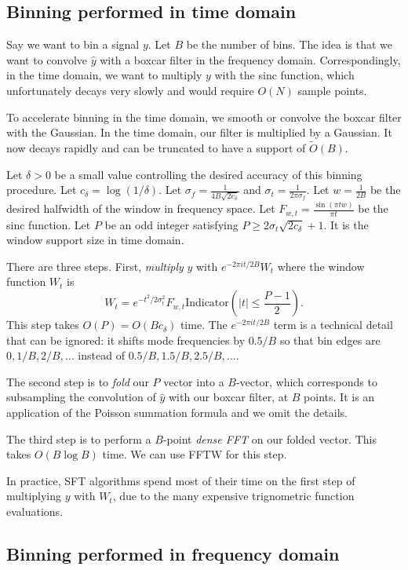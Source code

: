 \documentclass[10pt]{article}
\begin{document}
\subsection{Binning performed in time domain}

Say we want to bin a signal $y$. Let $B$ be the number of bins. The idea is that we want to convolve $\hat{y}$ with a boxcar filter in the frequency domain. Correspondingly, in the time domain, we want to multiply $y$ with the sinc function, which unfortunately decays very slowly and would require $O(N)$ sample points.

To accelerate binning in the time domain, we smooth or convolve the boxcar filter with the Gaussian. In the time domain, our filter is multiplied by a Gaussian. It now decays rapidly and can be truncated to have a support of $\tilde{O}(B)$.

Let $\delta>0$ be a small value controlling the desired accuracy of this binning procedure. Let $c_{\delta} = \log (1/\delta)$. Let $\sigma_f = \frac{1}{4B\sqrt{2c_{\delta}}}$ and $\sigma_t = \frac{1}{2\pi \sigma_f}$. Let $w=\frac{1}{2B}$ be the desired halfwidth of the window in frequency space. Let $F_{w,t} = \frac{\sin(\pi t w)}{\pi t}$ be the sinc function. Let $P$ be an odd integer satisfying $P \geq 2\sigma_t \sqrt{2c_{\delta}} + 1$. It is the window support size in time domain.

There are three steps. First, \emph{multiply} $y$ with $e^{-2\pi i t/2B}W_t$ where the window function $W_t$ is 
$$W_t = e^{-t^2/2\sigma_t^2} F_{w,t} \text{Indicator}\left(|t|\leq \frac{P-1}{2}\right).$$
This step takes $O(P)=O(B c_{\delta})$ time. The $e^{-2\pi i t/2B}$ term is a technical detail that can be ignored: it shifts mode frequencies by $0.5/B$ so that bin edges are $0, 1/B, 2/B, \ldots$ instead of $0.5/B, 1.5/B, 2.5/B, \ldots$.

The second step is to \emph{fold} our $P$ vector into a $B$-vector, which corresponds to subsampling the convolution of $\hat{y}$ with our boxcar filter, at $B$ points. It is an application of the Poisson summation formula and we omit the details.

The third step is to perform a $B$-point \emph{dense FFT} on our folded vector. This takes $O(B\log B)$ time. We can use FFTW for this step.

In practice, SFT algorithms spend most of their time on the first step of multiplying $y$ with $W_t$, due to the many expensive trignometric function evaluations.

\subsection{Binning performed in frequency domain}
\end{document}
